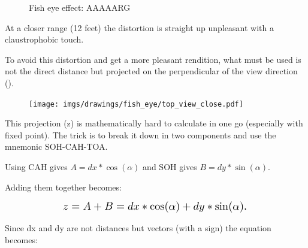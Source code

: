 \begin{minipage}{\textwidth}
 \begin{figure}[H]
\centering
 \caption{Fish eye effect: AAAAARG} \label{fig:mips}
 \end{figure}
 

\begin{minipage}{.4\textwidth}
At a closer range (12 feet) the distortion is straight up unpleasant with a claustrophobic touch.\\
\par
To avoid this distortion and get a more pleasant rendition, what must be used is not the direct distance  but  projected on the perpendicular of the view direction ().
 \end{minipage}
\begin{minipage}{.6\textwidth}
 \begin{figure}[H]
  \begin{flushright}
  \texttt{[image: imgs/drawings/fish\_eye/top\_view\_close.pdf]}
 \end{flushright}
\end{figure}
 \end{minipage}
\end{minipage}
\par



\begin{figure}[H]

 
\label{fig:Raycasting2}
 
\end{figure}

This projection (z) is mathematically hard to calculate in one go (especially with fixed point). The trick is to break it down in two components and use the mnemonic SOH-CAH-TOA.\\


\begin{figure}[H]
\centering
 
 
\end{figure}
Using CAH gives $A = dx * \cos(\alpha)$ and SOH gives $B = dy * \sin(\alpha) $.\\
\par

Adding them together becomes:
\par
\begin{figure}[H]
  \centering
  \begin{equation*}
    \scalebox{1.3}{
$z = A + B = dx * \cos(\alpha) + dy * \sin(\alpha) $. 
 }
  \end{equation*}
\end{figure}
Since dx and dy are not distances but vectors (with a sign) the equation becomes: 


